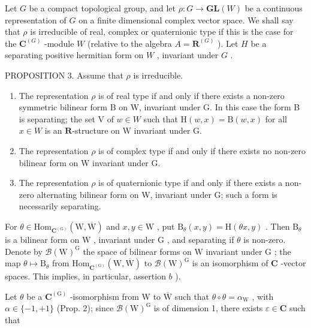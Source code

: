 
Let \(G\) be a compact topological group, and let \(\rho : G \to \mathbf{GL}(W)\) be a continuous representation of \(G\) on a finite dimensional complex vector space. We shall say that \(\rho\) is irreducible of real, complex or quaternionic type if this is the case for the \(\mathbf{C}^{(G)}\) -module \(W\) (relative to the algebra \(A = \mathbf{R}^{(G)}\) ). Let \(H\) be a separating positive hermitian form on \(W\) , invariant under \(G\) .

PROPOSITION 3. Assume that \(\rho\) is irreducible.

\begin{enumerate}
\def\labelenumi{\alph{enumi})}
\item
  The representation \(\rho\) is of real type if and only if there exists a non-zero symmetric bilinear form B on W, invariant under G. In this case the form B is separating; the set V of \(w \in W\) such that \(\mathrm{H}(w, x) = \mathrm{B}(w, x)\) for all \(x \in W\) is an \(\mathbf{R}\)-structure on W invariant under G.
\item
  The representation \(\rho\) is of complex type if and only if there exists no non-zero bilinear form on W invariant under G.
\item
  The representation \(\rho\) is of quaternionic type if and only if there exists a non-zero alternating bilinear form on W, invariant under G; such a form is necessarily separating.
\end{enumerate}

For \(\theta \in \mathrm{Hom}_{\mathbf{C}^{(\mathrm{G})}}(\mathrm{W},\overline{\mathrm{W}})\) and \(x,y\in \mathrm{W}\) , put \(\mathrm{B}_{\theta}(x,y) = \mathrm{H}(\theta x,y)\) . Then \(\mathrm{B}_{\theta}\) is a bilinear form on \(\mathrm{W}\) , invariant under \(\mathrm{G}\) , and separating if \(\theta\) is non-zero. Denote by \(\mathcal{B}(\mathrm{W})^{\mathrm{G}}\) the space of bilinear forms on \(\mathrm{W}\) invariant under \(\mathrm{G}\) ; the map \(\theta \mapsto \mathrm{B}_{\theta}\) from \(\mathrm{Hom}_{\mathbf{C}^{(\mathrm{G})}}(\mathrm{W},\overline{\mathrm{W}})\) to \(\mathcal{B}(\mathrm{W})^{\mathrm{G}}\) is an isomorphism of \(\mathbf{C}\) -vector spaces. This implies, in particular, assertion \(b\) ).

Let \(\theta\) be a \(\mathbf{C}^{(\mathrm{G})}\) -isomorphism from W to \(\overline{\mathrm{W}}\) such that \(\theta \circ \theta = \alpha_{\mathrm{W}}\) , with \(\alpha \in \{-1, +1\}\) (Prop. 2); since \(\mathcal{B}(\mathrm{W})^{\mathrm{G}}\) is of dimension 1, there exists \(\varepsilon \in \mathbf{C}\) such that

